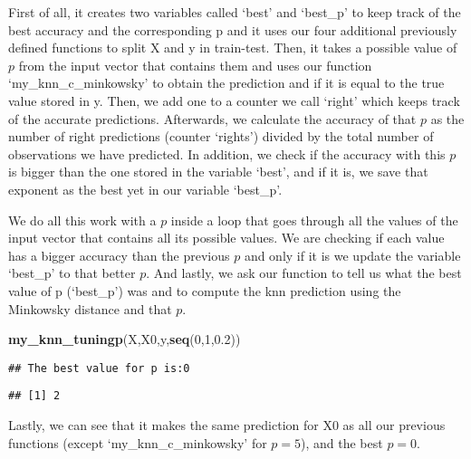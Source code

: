 \documentclass[
]{article}
\newenvironment{Shaded}{\begin{snugshade}}{\end{snugshade}}
\newcommand{\DecValTok}[1]{\textcolor[rgb]{0.00,0.00,0.81}{#1}}
\newcommand{\FloatTok}[1]{\textcolor[rgb]{0.00,0.00,0.81}{#1}}
\newcommand{\FunctionTok}[1]{\textcolor[rgb]{0.13,0.29,0.53}{\textbf{#1}}}
\newcommand{\NormalTok}[1]{#1}
\begin{document}
First of all, it creates two variables called `best' and `best\_p' to
keep track of the best accuracy and the corresponding p and it uses our
four additional previously defined functions to split X and y in
train-test. Then, it takes a possible value of \(p\) from the input
vector that contains them and uses our function `my\_knn\_c\_minkowsky'
to obtain the prediction and if it is equal to the true value stored in
y. Then, we add one to a counter we call `right' which keeps track of
the accurate predictions. Afterwards, we calculate the accuracy of that
\(p\) as the number of right predictions (counter `rights') divided by
the total number of observations we have predicted. In addition, we
check if the accuracy with this \(p\) is bigger than the one stored in
the variable `best', and if it is, we save that exponent as the best yet
in our variable `best\_p'.

We do all this work with a \(p\) inside a loop that goes through all the
values of the input vector that contains all its possible values. We are
checking if each value has a bigger accuracy than the previous \(p\) and
only if it is we update the variable `best\_p' to that better \(p\). And
lastly, we ask our function to tell us what the best value of p
(`best\_p') was and to compute the knn prediction using the Minkowsky
distance and that \(p\).

\begin{Shaded}
\begin{Highlighting}[]
\FunctionTok{my\_knn\_tuningp}\NormalTok{(X,X0,y,}\FunctionTok{seq}\NormalTok{(}\DecValTok{0}\NormalTok{,}\DecValTok{1}\NormalTok{,}\FloatTok{0.2}\NormalTok{))}
\end{Highlighting}
\end{Shaded}

\begin{verbatim}
## The best value for p is:0
\end{verbatim}

\begin{verbatim}
## [1] 2
\end{verbatim}

Lastly, we can see that it makes the same prediction for X0 as all our
previous functions (except `my\_knn\_c\_minkowsky' for \(p=5\)), and the
best \(p=0\).
\end{document}
